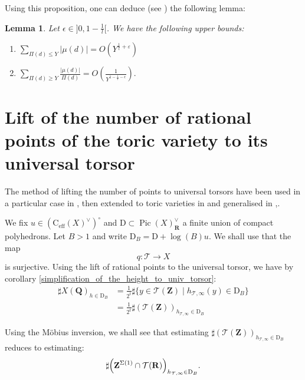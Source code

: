 \documentclass{proc-l}
\newcommand{\R}{\mathbf{R}}
\newcommand{\Z}{\mathbf{Z}}
\newcommand{\Q}{\mathbf{Q}}
\newcommand{\cone}{\text{C}_{\text{eff}}(X)}
\DeclareMathOperator{\Pic}{Pic}
\newcommand{\stackT}{\mathcal{T}}
\newtheorem{lemma}[theorem]{Lemma}
\theoremstyle{definition}
\theoremstyle{remark}
\numberwithin{equation}{section}
\begin{document}
Using this proposition, one can deduce (see \cite[lemma 11.19]{salberger_torsor}) the following lemma:
\begin{lemma}\label{majoration_fonction_de_mobius}
    Let $\epsilon \in ]0,1 - \frac{1}{l}[$. We have the following upper bounds:
    \begin{enumerate}
        \item $\sum\limits_{\Pi(d)\leqslant Y} |\mu(d)| = O\left( Y^{\frac{1}{l} + \varepsilon}\right)$
        \item $\sum\limits_{\Pi(d)\geqslant Y} \frac{| \mu(d) |}{\Pi(d)} = O\left( \frac{1}{Y^{1 - \frac{1}{l} - \epsilon}} \right).$
    \end{enumerate}
\end{lemma}



\section{Lift of the number of rational points of the toric variety to its universal torsor}

The method of lifting the number of points to universal torsors have been used in  a particular case in \cite{peyre_duke}, then extended to toric varieties in \cite[section 11]{salberger_torsor} and generalised in \cite{methode_du_cercle_peyre},\cite{Peyre_beyond_height}.


We fix $u \in (\cone^{\vee})^{\circ}$ and $\mathrm{D} \subset \Pic(X)^{\vee}_{\R}$ a finite union of compact polyhedrons. Let $B > 1$ and write $\mathrm{D}_B = \mathrm{D} + \log(B) u $. We shall use that the map
$$ q : \stackT \rightarrow X$$is surjective. Using the lift of rational points to the universal torsor, we have by corollary \ref{simplification_of_the_height_to_univ_torsor}:
\begin{align*}
    \sharp X(\Q)_{h \in \mathrm{D}_B} &= \frac{1}{2^t} \sharp \{ y \in \stackT(\Z) \mid h_{\stackT,\infty}(y) \in \mathrm{D}_B \} \\
    &= \frac{1}{2^t} \sharp \left( \stackT(\Z) \right)_{h_{\stackT,\infty} \in \mathrm{D}_B}
\end{align*}


Using the Möbius inversion, we shall see that estimating $\sharp \left( \stackT(\Z) \right)_{h_{\stackT,\infty} \in \mathrm{D}_B}$ reduces to estimating:
$$\sharp \Bigl( \Z^{\Sigma(1)} \cap \stackT(\R) \Bigr)_{h_{\stackT,\infty} \in \mathrm{D}_B} .$$
\end{document}

